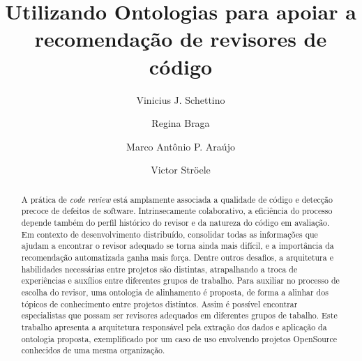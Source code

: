 \documentclass[sigconf]{acmart}
\begin{document}
\title{Utilizando Ontologias para apoiar a recomendação de revisores de código}

\author{Vinicius J. Schettino}

\author{Regina Braga}

\author{Marco Antônio P. Araújo}

\author{Victor Ströele}

\renewcommand{\shortauthors}{Schettino et al.}


\begin{abstract}
A prática de \textit{code review} está amplamente associada a qualidade de código e detecção precoce de defeitos de software. Intrinsecamente colaborativo, a eficiência do processo depende também do perfil histórico do revisor e da natureza do código em avaliação. Em contexto de desenvolvimento distribuído, consolidar todas as informações que ajudam a encontrar o revisor adequado se torna ainda mais difícil, e a importância da recomendação automatizada ganha mais força. Dentre outros desafios, a arquitetura e habilidades necessárias entre projetos são distintas, atrapalhando a troca de experiências e auxílios entre diferentes grupos de trabalho. Para auxiliar no processo de escolha do revisor, uma ontologia de alinhamento é proposta, de forma a  alinhar dos tópicos de conhecimento entre projetos distintos. Assim é possível encontrar especialistas que possam ser revisores adequados em diferentes grupos de tabalho. Este trabalho apresenta a  arquitetura responsável pela extração dos dados e aplicação da ontologia proposta, exemplificado por um caso de uso envolvendo projetos OpenSource conhecidos de uma mesma organização.
\end{abstract}
\end{document}
